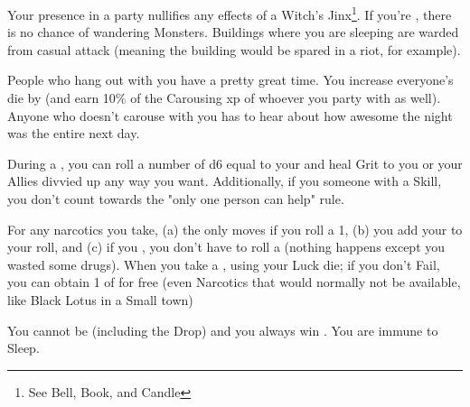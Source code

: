{    

  
    Your presence in a party nullifies any effects of a Witch's Jinx\footnote{See Bell, Book, and Candle}.  If you're , there is no chance of wandering Monsters. Buildings where you are sleeping are warded from casual attack (meaning the building would be spared in a riot, for example). 

  
    People who hang out with you have a pretty great time.  You increase everyone's  die by \DCUP (and earn 10\% of the Carousing xp of whoever you party with as well). Anyone who doesn't carouse with you has to hear about how awesome the night was the entire next day.    

  
    During a , you can roll a number of d6 equal to your \LVL and heal \SUM Grit to you or your Allies divvied up any way you want.  Additionally, if you  someone with a Skill, you don't count towards the "only one person can help" rule.


    For any narcotics you take, (a) the \UD only moves \DCDOWN if you roll a 1, (b) you add your \LVL to your  roll, and (c) if you , you don't have to roll a  (nothing happens except you wasted some drugs).  When you take a , \RS using your Luck die; if you don't Fail, you can obtain 1 \UD of   for free (even Narcotics that would normally not be available, like Black Lotus in a Small town)

  
    You cannot be  (including the Drop) and you always win .  You are immune to Sleep.




}
